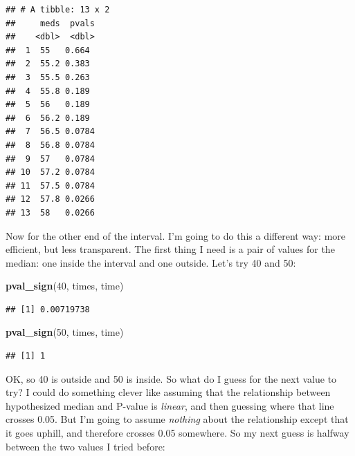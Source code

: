 \documentclass[]{tufte-book}
\newenvironment{Shaded}{}{}
\newcommand{\DataTypeTok}[1]{\textcolor[rgb]{0.56,0.13,0.00}{#1}}
\newcommand{\DecValTok}[1]{\textcolor[rgb]{0.25,0.63,0.44}{#1}}
\newcommand{\FloatTok}[1]{\textcolor[rgb]{0.25,0.63,0.44}{#1}}
\newcommand{\KeywordTok}[1]{\textcolor[rgb]{0.00,0.44,0.13}{\textbf{#1}}}
\newcommand{\NormalTok}[1]{#1}
\newcommand{\OperatorTok}[1]{\textcolor[rgb]{0.40,0.40,0.40}{#1}}
\newcommand{\StringTok}[1]{\textcolor[rgb]{0.25,0.44,0.63}{#1}}
\theoremstyle{definition}
\theoremstyle{definition}
\theoremstyle{definition}
\theoremstyle{remark}
\begin{document}
\begin{Shaded}
\end{Shaded}

\begin{verbatim}
## # A tibble: 13 x 2
##     meds  pvals
##    <dbl>  <dbl>
##  1  55   0.664 
##  2  55.2 0.383 
##  3  55.5 0.263 
##  4  55.8 0.189 
##  5  56   0.189 
##  6  56.2 0.189 
##  7  56.5 0.0784
##  8  56.8 0.0784
##  9  57   0.0784
## 10  57.2 0.0784
## 11  57.5 0.0784
## 12  57.8 0.0266
## 13  58   0.0266
\end{verbatim}

Now for the other end of the interval. I'm going to do this a different
way: more efficient, but less transparent. The first thing I need is a
pair of values for the median: one inside the interval and one outside.
Let's try 40 and 50:

\begin{Shaded}
\begin{Highlighting}[]
\KeywordTok{pval_sign}\NormalTok{(}\DecValTok{40}\NormalTok{, times, time)}
\end{Highlighting}
\end{Shaded}

\begin{verbatim}
## [1] 0.00719738
\end{verbatim}

\begin{Shaded}
\begin{Highlighting}[]
\KeywordTok{pval_sign}\NormalTok{(}\DecValTok{50}\NormalTok{, times, time)}
\end{Highlighting}
\end{Shaded}

\begin{verbatim}
## [1] 1
\end{verbatim}

OK, so 40 is outside and 50 is inside. So what do I guess for the next
value to try? I could do something clever like assuming that the
relationship between hypothesized median and P-value is \emph{linear},
and then guessing where that line crosses 0.05. But I'm going to assume
\emph{nothing} about the relationship except that it goes uphill, and
therefore crosses 0.05 somewhere. So my next guess is halfway between
the two values I tried before:
\end{document}
